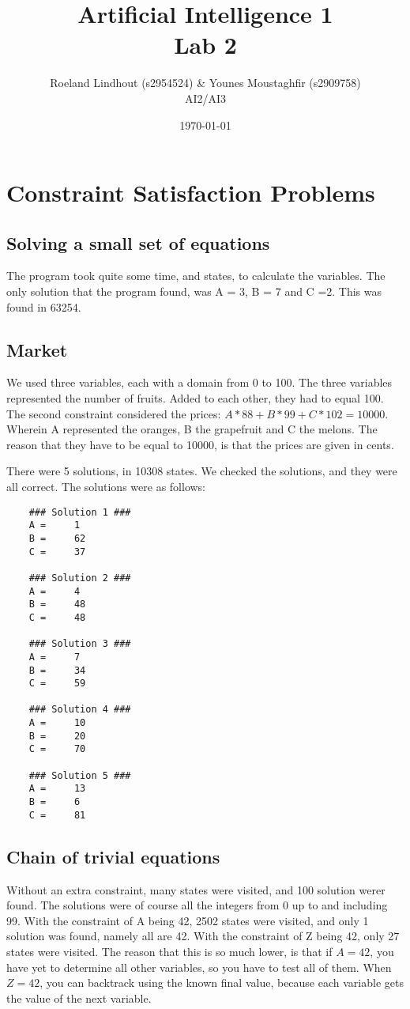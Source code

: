 \documentclass{article}
\title{Artificial Intelligence 1 \\ Lab 2}%
\author{Roeland Lindhout (s2954524) \& Younes Moustaghfir (s2909758) \\ AI2/AI3} %
\date{\today}%
\begin{document}
	
	\maketitle
	
	\section{Constraint Satisfaction Problems}
	
	\subsection*{Solving a small set of equations}
	
	The program took quite some time, and states, to calculate the variables. The only solution that the program found, was A = 3, B = 7 and C =2. This was found in 63254.
	
	\subsection*{Market}
	
	We used three variables, each with a domain from 0 to 100. The three variables represented the number of fruits. Added to each other, they had to equal 100. The second constraint considered the prices: $A*88 + B*99 + C*102 = 10000$. Wherein A represented the oranges, B the grapefruit and C the melons. The reason that they have to be equal to 10000, is that the prices are given in cents. 
	
	There were 5 solutions, in 10308 states. We checked the solutions, and they were all correct. The solutions were as follows: 
	\begin{lstlisting}	
	### Solution 1 ###
	A = 	1 
	B = 	62 
	C = 	37 

	### Solution 2 ###
	A = 	4 
	B = 	48 
	C = 	48 

	### Solution 3 ###
	A = 	7 
	B = 	34 
	C = 	59 

	### Solution 4 ###
	A = 	10 
	B = 	20 
	C = 	70 

	### Solution 5 ###
	A = 	13 
	B = 	6 
	C = 	81 
	\end{lstlisting}
	
	
	\subsection*{Chain of trivial equations}
	
	Without an extra constraint, many states were visited, and 100 solution werer found. The solutions were of course all the integers from 0 up to and including 99. With the constraint of A being 42, 2502 states were visited, and only 1 solution was found, namely all are 42. With the constraint of Z being 42, only 27 states were visited. The reason that this is so much lower, is that if $A = 42$, you have yet to determine all other variables, so you have to test all of them. When $Z = 42$, you can backtrack using the known final value, because each variable gets the value of the next variable. 
	
\end{document}
